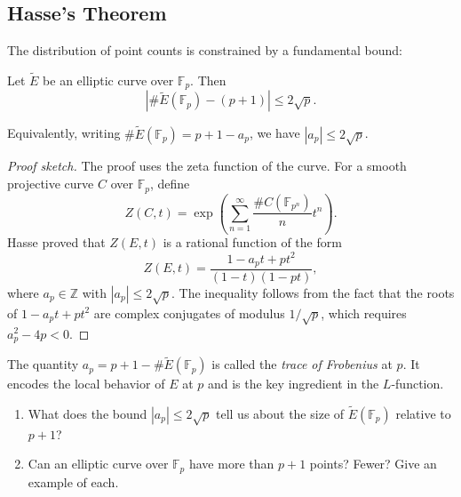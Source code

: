 \subsection{Hasse's Theorem}

The distribution of point counts is constrained by a fundamental bound:

\begin{theorem}[Hasse, 1933]
Let $\widetilde{E}$ be an elliptic curve over $\mathbb{F}_p$. Then
\[
\left|\#\widetilde{E}(\mathbb{F}_p) - (p + 1)\right| \le 2\sqrt{p}.
\]
\end{theorem}

Equivalently, writing $\#\widetilde{E}(\mathbb{F}_p) = p + 1 - a_p$, we have $|a_p| \le 2\sqrt{p}$.

\begin{proof}[Proof sketch]
The proof uses the zeta function of the curve. For a smooth projective curve $C$ over $\mathbb{F}_p$, define
\[
Z(C, t) = \exp\left(\sum_{n=1}^{\infty} \frac{\#C(\mathbb{F}_{p^n})}{n} t^n\right).
\]
Hasse proved that $Z(E, t)$ is a rational function of the form
\[
Z(E, t) = \frac{1 - a_p t + p t^2}{(1 - t)(1 - pt)},
\]
where $a_p \in \mathbb{Z}$ with $|a_p| \le 2\sqrt{p}$. The inequality follows from the fact that the roots of $1 - a_p t + pt^2$ are complex conjugates of modulus $1/\sqrt{p}$, which requires $a_p^2 - 4p < 0$.
\end{proof}

The quantity $a_p = p + 1 - \#\widetilde{E}(\mathbb{F}_p)$ is called the \emph{trace of Frobenius} at $p$. It encodes the local behavior of $E$ at $p$ and is the key ingredient in the $L$-function.

\begin{checkyou}
\begin{enumerate}
\item What does the bound $|a_p| \le 2\sqrt{p}$ tell us about the size of $\widetilde{E}(\mathbb{F}_p)$ relative to $p+1$?
\item Can an elliptic curve over $\mathbb{F}_p$ have more than $p+1$ points? Fewer? Give an example of each.
\end{enumerate}
\end{checkyou}

